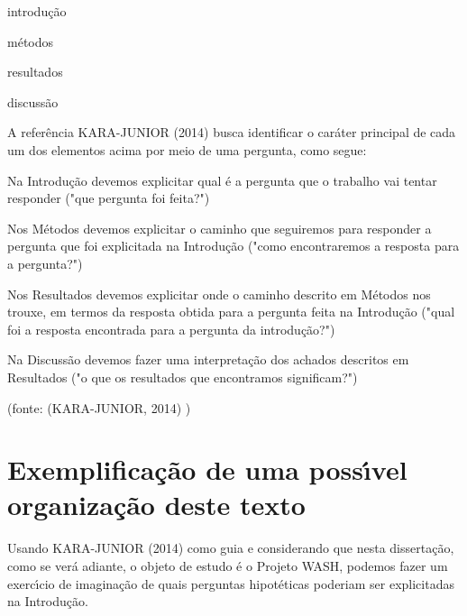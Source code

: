 \documentclass[
12pt,		%
openright,	%
twoside,  %
a4paper,			%
chapter=TITLE,		%
english,			%
french,				%
spanish,			%
brazil				%
]{USPSC-classe/USPSC}
\begin{document}
\begin{alineas}
\item introdu\c{c}\~ao
\item m\'etodos
\item resultados
\item discuss\~ao
\end{alineas}

A refer\^encia KARA-JUNIOR (2014) busca identificar o car\'ater principal de cada um dos elementos acima por meio de uma pergunta, como segue:



\begin{alineas}
\item Na Introdu\c{c}\~ao devemos explicitar qual \'e a pergunta que o trabalho vai tentar responder   ("que pergunta foi feita?")
\item Nos M\'etodos devemos explicitar o caminho que seguiremos para responder a pergunta que foi explicitada na Introdu\c{c}\~ao ("como encontraremos a resposta para a pergunta?")
\item Nos Resultados devemos explicitar onde o caminho descrito em M\'etodos nos trouxe, em termos da resposta obtida para a pergunta feita na Introdu\c{c}\~ao ("qual foi a resposta encontrada para a pergunta da introdu\c{c}\~ao?")
\item Na Discuss\~ao devemos fazer uma interpreta\c{c}\~ao dos achados descritos em Resultados ("o que os resultados que encontramos significam?")
\end{alineas}

\begin{flushright}
\setlength{\absparsep}{0pt}
\tiny \begin{flushright}
\setlength{\absparsep}{0pt}
\tiny (fonte:  (KARA-JUNIOR, 2014) ) \normalsize 
\end{flushright}

 \normalsize 
\end{flushright}


\section[Exemplifica\c{c}\~ao de uma poss\'{\i}vel organiza\c{c}\~ao deste texto]{Exemplifica\c{c}\~ao de uma poss\'{\i}vel organiza\c{c}\~ao deste texto}\label{Exemplifica\c{c}\~ao de uma poss\'{\i}vel organiza\c{c}\~ao deste texto}
Usando  KARA-JUNIOR (2014) como guia e considerando que nesta disserta\c{c}\~ao, como se ver\'a adiante, o objeto de estudo \'e o Projeto WASH, podemos fazer um exerc\'{\i}cio de imagina\c{c}\~ao de quais perguntas hipot\'eticas poderiam ser explicitadas na Introdu\c{c}\~ao.
\end{document}

